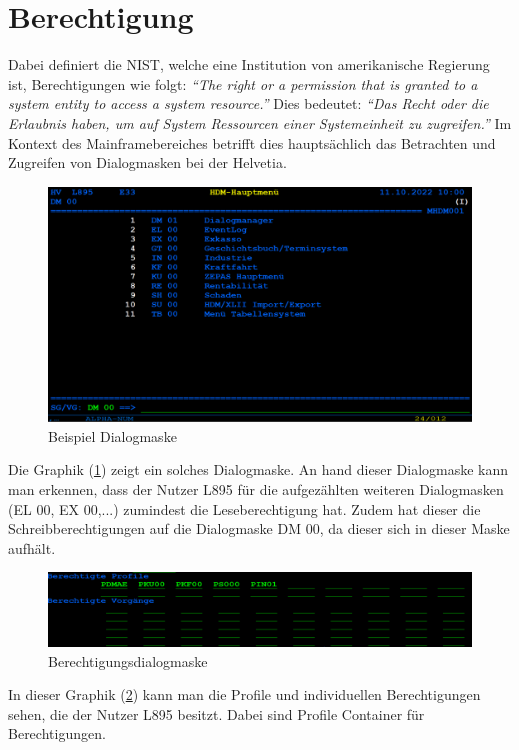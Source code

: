 \section{Berechtigung}
\label{sec:Berechtigung}
Dabei definiert die \ac{NIST}, welche eine Institution von amerikanische Regierung ist, Berechtigungen wie folgt:
\newline
\newline
\textit{"`The right or a permission that is granted to a system entity to access a system resource."'} \cite{Auth}
\newline
\newline
Dies bedeutet:
\newline
\newline
\textit{"`Das Recht oder die Erlaubnis haben, um auf System Ressourcen einer Systemeinheit zu zugreifen."'} \cite{Mainframe}
\newline
\newline
Im Kontext des Mainframebereiches betrifft dies hauptsächlich das Betrachten und Zugreifen von Dialogmasken bei der Helvetia.
\begin{figure}[h!]
 \centering
 \includegraphics[width=1\textwidth]{gfx/Picture/Dialog.PNG}
 \caption{Beispiel Dialogmaske}
 \label{fig:Dial}
\end{figure}
Die Graphik (\ref{fig:Dial}) zeigt ein solches Dialogmaske.
An hand dieser Dialogmaske kann man erkennen, dass der Nutzer L895 für die aufgezählten weiteren Dialogmasken (EL 00, EX 00,...) zumindest die Leseberechtigung hat.
Zudem hat dieser die Schreibberechtigungen auf die Dialogmaske DM 00, da dieser sich in dieser Maske aufhält. 
\newline
\newline
\begin{figure}[h!]
 \centering
 \includegraphics[width=1\textwidth]{gfx/Picture/Berechtigung.PNG}
 \caption{Berechtigungsdialogmaske}
 \label{fig:Berch}
\end{figure}
In dieser Graphik (\ref{fig:Berch}) kann man die Profile und individuellen Berechtigungen sehen, die der Nutzer L895 besitzt.
Dabei sind Profile Container für Berechtigungen.

